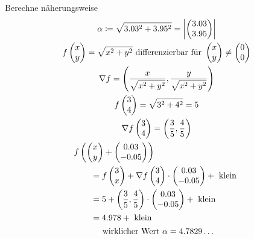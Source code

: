 \begin{bsp}
	Berechne näherungsweise
	\begin{gather*}
		\alpha \coloneqq \sqrt{3.03^2 + 3.95^2} = \abs{\begin{pmatrix} 3.03 \\ 3.95 \end{pmatrix}} \\
		f\begin{pmatrix} x \\ y \end{pmatrix} = \sqrt{x^2+y^2} \text{ differenzierbar für } \begin{pmatrix} x \\ y \end{pmatrix} \neq \begin{pmatrix} 0 \\ 0 \end{pmatrix} \\
		\nabla f = \left( \frac{x}{\sqrt{x^2+y^2}} , \frac{y}{\sqrt{x^2+y^2}} \right) \\
		f\begin{pmatrix} 3 \\ 4 \end{pmatrix} = \sqrt{3^2 + 4^2} = 5 \\
		\nabla f\begin{pmatrix} 3 \\ 4 \end{pmatrix} = \left( \frac{3}{5} , \frac{4}{5} \right) \\
		\begin{split}
			&f\left( \begin{pmatrix} x \\ y \end{pmatrix} + \begin{pmatrix} 0.03 \\ -0.05 \end{pmatrix} \right) \\
				&\qquad= f\begin{pmatrix} 3 \\ x \end{pmatrix} + \nabla f\begin{pmatrix} 3 \\ 4 \end{pmatrix} \cdot \begin{pmatrix} 0.03 \\ -0.05 \end{pmatrix} + \text{ klein } \\
				&\qquad= 5 + \left( \frac{3}{5} , \frac{4}{5} \right) \cdot \begin{pmatrix} 0.03 \\ -0.05 \end{pmatrix} + \text{ klein } \\
				&\qquad= 4.978 + \text{ klein }
		\end{split} \\
		\text{ wirklicher Wert } \alpha = 4.7829\dots
	\end{gather*}
\end{bsp}
